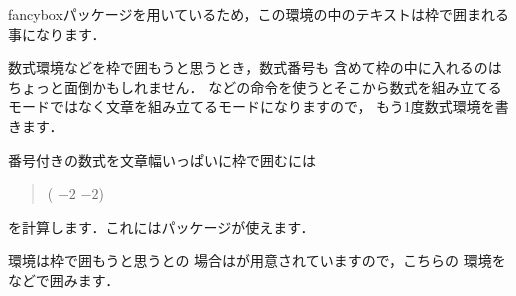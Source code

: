 \begin{intext}
\newenvironment{fminipage}%
  {\begin{Sbox}\begin{minipage}}%
  {\end{minipage}\end{Sbox}\fbox{\TheSbox}}
\end{intext}


\begin{inout}
\newenvironment{fminipage}%
  {\begin{Sbox}\begin{minipage}}%
  {\end{minipage}\end{Sbox}%
   \fbox{\TheSbox}}
\begin{fminipage}{.8\linewidth}
fancyboxパッケージを用いているため，この環境の中のテキストは枠で囲まれる事になります．
\end{fminipage}
\end{inout}

数式環境などを枠で囲もうと思うとき，数式番号も
含めて枠の中に入れるのはちょっと面倒かもしれません．
などの命令を使うとそこから数式を組み立てる
モードではなく文章を組み立てるモードになりますので，
もう1度数式環境を書きます．

番号付きの数式を文章幅いっぱいに枠で囲むには
\begin{quote}
 (  $-2$ $-2$)
\end{quote}
を計算します．これにはパッケージが使えます．
\begin{inout}
\usepackage{calc,fancybox} 
\end{inout}

環境は枠で囲もうと思うとの
場合はが用意されていますので，こちらの
環境を などで囲みます．
\begin{inout}
\end{inout}

